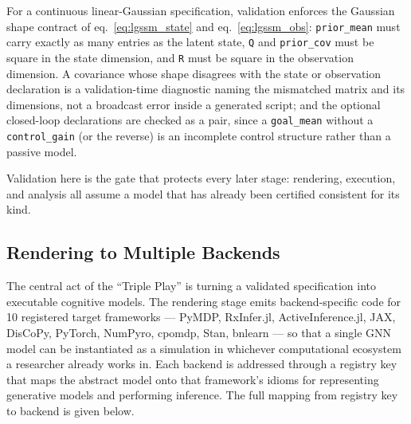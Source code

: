 \documentclass[
  english,
  9pt,
]{extarticle}
\begin{document}
For a continuous linear-Gaussian specification, validation enforces the
Gaussian shape contract of eq.~\ref{eq:lgssm_state} and
eq.~\ref{eq:lgssm_obs}: \texttt{prior\_mean} must carry exactly as many
entries as the latent state, \texttt{Q} and \texttt{prior\_cov} must be
square in the state dimension, and \texttt{R} must be square in the
observation dimension. A covariance whose shape disagrees with the state
or observation declaration is a validation-time diagnostic naming the
mismatched matrix and its dimensions, not a broadcast error inside a
generated script; and the optional closed-loop declarations are checked
as a pair, since a \texttt{goal\_mean} without a \texttt{control\_gain}
(or the reverse) is an incomplete control structure rather than a
passive model.

Validation here is the gate that protects every later stage: rendering,
execution, and analysis all assume a model that has already been
certified consistent for its kind.

\subsection{Rendering to Multiple
Backends}\label{rendering-to-multiple-backends}

The central act of the ``Triple Play'' is turning a validated
specification into executable cognitive models. The rendering stage
emits backend-specific code for 10 registered target frameworks ---
PyMDP, RxInfer.jl, ActiveInference.jl, JAX, DisCoPy, PyTorch, NumPyro,
cpomdp, Stan, bnlearn --- so that a single GNN model can be instantiated
as a simulation in whichever computational ecosystem a researcher
already works in. Each backend is addressed through a registry key that
maps the abstract model onto that framework's idioms for representing
generative models and performing inference. The full mapping from
registry key to backend is given below.
\end{document}

